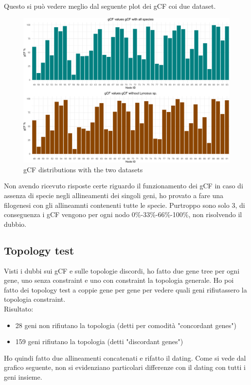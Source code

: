 \pagebreak
Questo si può vedere meglio dal seguente plot dei gCF coi due dataset.

\begin{figure}[h!]
    \centering
    \includegraphics[width=1\textwidth]{Figures/gCF.png}
    \caption[gCF Distribution Plot]{gCF distributions with the two datasets
}
    \label{fig:gCF_distributions}
\end{figure}

Non avendo ricevuto risposte certe riguardo il funzionamento dei gCF in caso di assenza di specie negli allineamenti dei singoli geni, ho provato a fare una filogenesi con gli allineamnti contenenti tutte le specie. Purtroppo sono solo 3, di conseguenza i gCF vengono per ogni nodo 0\%-33\%-66\%-100\%, non risolvendo il dubbio.

\pagebreak
\subsection{Topology test}
Visti i dubbi sui gCF e sulle topologie discordi, ho fatto due gene tree per ogni gene, uno senza constraint e uno con constraint la topologia generale. Ho poi fatto dei topology test a coppie gene per gene per vedere quali geni rifiutassero la topologia constraint.
\\Risultato:
\begin{itemize}
    \item 28 geni non rifiutano la topologia (detti per comodità "concordant genes")
    \item 159 geni rifiutano la topologia (detti "discordant genes")
\end{itemize}
Ho quindi fatto due allineamenti concatenati e rifatto il dating. Come si vede dal grafico seguente, non si evidenziano particolari differenze con il dating con tutti i geni insieme.

